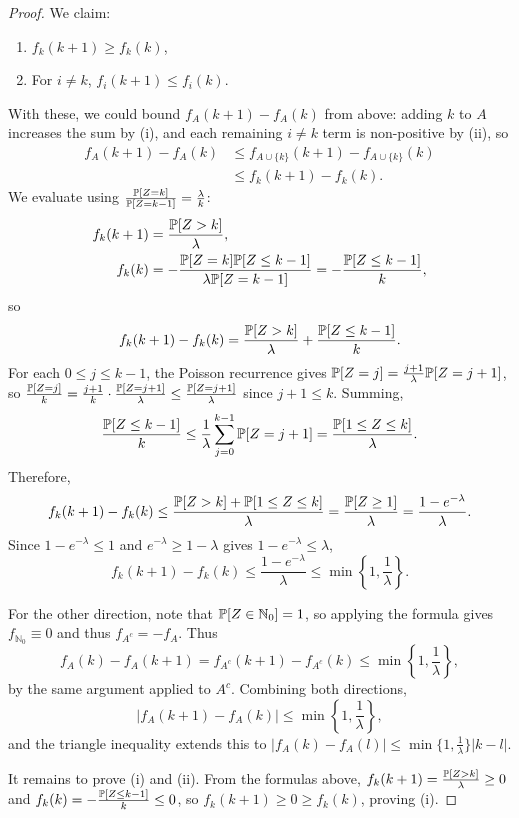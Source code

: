 \begin{proof}
	We claim:
	\begin{enumerate}[label=(\roman*)]
		\item $f_k(k+1) \ge f_k(k)$,
		\item For $i \ne k$, $f_i(k+1) \le f_i(k)$.
	\end{enumerate}
	With these, we could bound $f_A(k+1) - f_A(k)$ from above: adding $k$ to $A$ increases the sum by (i), and each remaining $i \ne k$ term is non-positive by (ii), so
	\begin{align*}
		f_A(k+1) - f_A(k)
		&\le f_{A \cup \{k\}}(k+1) - f_{A \cup \{k\}}(k) \\
		&\le f_k(k+1) - f_k(k).
	\end{align*}
	We evaluate using $\frac{\P[Z=k]}{\P[Z=k-1]} = \frac{\lambda}{k}$:
	\begin{align*}
		f_k(k+1) &= \frac{\P[Z > k]}{\lambda}, \\
		f_k(k)   &= -\frac{\P[Z=k] \P[Z \le k-1]}{\lambda \P[Z=k-1]} = -\frac{\P[Z \le k-1]}{k},
	\end{align*}
	so
	\[
		f_k(k+1) - f_k(k) = \frac{\P[Z > k]}{\lambda} + \frac{\P[Z \le k-1]}{k}.
	\]
	For each $0 \le j \le k-1$, the Poisson recurrence gives $\P[Z=j] = \frac{j+1}{\lambda}\P[Z=j+1]$, so $\frac{\P[Z=j]}{k} = \frac{j+1}{k}\cdot\frac{\P[Z=j+1]}{\lambda} \le \frac{\P[Z=j+1]}{\lambda}$ since $j+1 \le k$. Summing,
	\[
		\frac{\P[Z \le k-1]}{k} \le \frac{1}{\lambda}\sum\limits_{j=0}^{k-1}\P[Z=j+1] = \frac{\P[1 \le Z \le k]}{\lambda}.
	\]
	Therefore,
	\[
		f_k(k+1) - f_k(k)
		\le \frac{\P[Z > k] + \P[1 \le Z \le k]}{\lambda}
		= \frac{\P[Z \ge 1]}{\lambda}
		= \frac{1 - e^{-\lambda}}{\lambda}.
	\]
	Since $1-e^{-\lambda} \le 1$ and $e^{-\lambda} \ge 1-\lambda$ gives $1-e^{-\lambda} \le \lambda$,
	\[
		f_k(k+1) - f_k(k) \le \frac{1-e^{-\lambda}}{\lambda} \le \min\!\left\{1,\frac{1}{\lambda}\right\}.
	\]

	For the other direction, note that $\P[Z \in \mathbb{N}_0] = 1$, so applying the formula gives $f_{\mathbb{N}_0} \equiv 0$ and thus $f_{A^c} = -f_A$. Thus
	\[
		f_A(k) - f_A(k+1) = f_{A^c}(k+1) - f_{A^c}(k) \le \min\!\left\{1,\frac{1}{\lambda}\right\},
	\]
	by the same argument applied to $A^c$. Combining both directions,
	\[
		\bigl|f_A(k+1) - f_A(k)\bigr| \le \min\!\left\{1,\frac{1}{\lambda}\right\},
	\]
	and the triangle inequality extends this to $|f_A(k) - f_A(l)| \le \min\{1,\tfrac{1}{\lambda}\}|k - l|$.

	It remains to prove (i) and (ii). From the formulas above, $f_k(k+1) = \frac{\P[Z>k]}{\lambda} \ge 0$ and $f_k(k) = -\frac{\P[Z\le k-1]}{k} \le 0$, so $f_k(k+1) \ge 0 \ge f_k(k)$, proving (i).


\end{proof}
